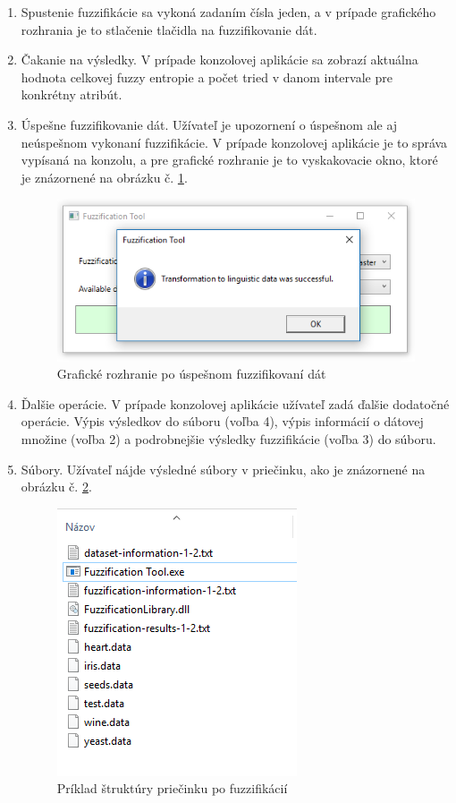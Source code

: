 \begin{enumerate}
\item Spustenie fuzzifikácie sa vykoná zadaním čísla jeden, a v prípade grafického rozhrania je to stlačenie tlačidla na fuzzifikovanie dát. 
\item Čakanie na výsledky. V prípade konzolovej aplikácie sa zobrazí aktuálna hodnota celkovej fuzzy entropie a počet tried v danom intervale pre konkrétny atribút.  
\item Úspešne fuzzifikovanie dát. Užívateľ je upozornení o úspešnom ale aj neúspešnom vykonaní fuzzifikácie. V prípade konzolovej aplikácie je to správa vypísaná na konzolu, a pre grafické rozhranie je to vyskakovacie okno, ktoré je znázornené na obrázku č. \ref{fig:guivstupnemenu2}. 

\begin{figure}[hp!]
\includegraphics[]{obrazky/gui_-_po_fuzzifikovani.PNG}
\centering
\caption{Grafické rozhranie po úspešnom fuzzifikovaní dát} 
\label{fig:guivstupnemenu2}
\end{figure}

\item Ďalšie operácie. V prípade konzolovej aplikácie užívateľ zadá ďalšie dodatočné operácie. Výpis výsledkov do súboru (voľba 4), výpis informácií o dátovej množine (voľba 2) a podrobnejšie výsledky fuzzifikácie (voľba 3) do súboru. 
\item Súbory. Užívateľ nájde výsledné súbory v priečinku, ako je znázornené na obrázku č. \ref{fig:obsah_priecinka_po_fuzzifikacii}.

\begin{figure}[hp!]
\includegraphics[]{obrazky/obsah_priecinka_po_fuzzifikacii.PNG}
\centering
\caption{ Príklad štruktúry priečinku po fuzzifikácií} 
\label{fig:obsah_priecinka_po_fuzzifikacii}
\end{figure}


\end{enumerate}


